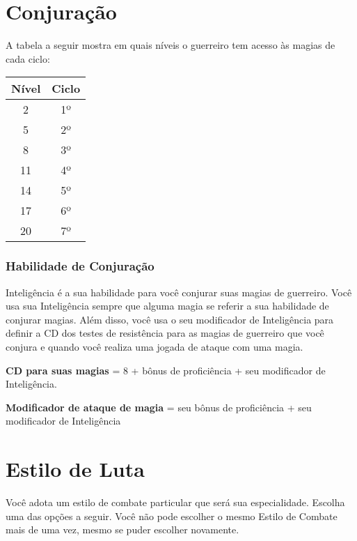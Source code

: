 \documentclass{RPG_Adventure}[2021/10/20]
\begin{document}
\begin{multicols}{2}
\section*{Conjuração}%

A tabela a seguir mostra em quais níveis o guerreiro tem acesso às magias de
cada ciclo:

\begin{center}
\begin{tabular}{|||c||c|||}
    \hline
    \textbf{Nível} & \textbf{Ciclo} \\
    \hline
    2 & 1º \\
    \hline
    5 & 2º \\
    \hline
    8 & 3º \\
    \hline
    11 & 4º \\
    \hline
    14 & 5º \\
    \hline
    17 & 6º \\
    \hline
    20 & 7º \\
    \hline
\end{tabular}
\end{center}

\subsubsection*{Habilidade de Conjuração}%

Inteligência é a sua habilidade para você conjurar suas magias de guerreiro.
Você usa sua Inteligência sempre que alguma magia se referir a sua habilidade de
conjurar magias. Além disso, você usa o seu modificador de Inteligência para
definir a CD dos testes de resistência para as magias de guerreiro que você
conjura e quando você realiza uma jogada de ataque com uma magia.

\begin{center}
\textbf{CD para suas magias} = 8 + bônus de proficiência + seu modificador de
Inteligência. \nl

\textbf{Modificador de ataque de magia} = seu bônus de proficiência + seu
modificador de Inteligência
\end{center}

\section*{Estilo de Luta}%

Você adota um estilo de combate particular que será sua especialidade. Escolha
uma das opções a seguir. Você não pode escolher o mesmo Estilo de Combate mais
de uma vez, mesmo se puder escolher novamente.


\end{multicols}
\end{document}

